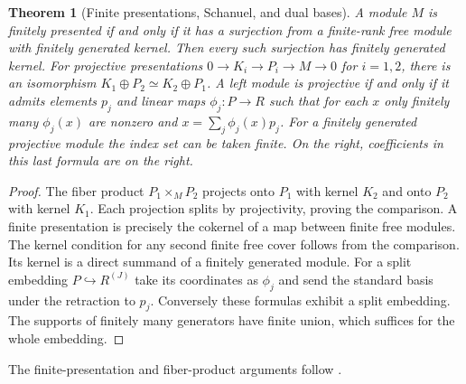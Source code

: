 \documentclass[11pt,oneside,openany]{book}
\newtheorem{theorem}{Theorem}[chapter]
\theoremstyle{definition}
\theoremstyle{remark}
\begin{document}
\begin{theorem}[Finite presentations, Schanuel, and dual bases]
\label{p103:ALG-03-C02-S02}
A module \(M\) is finitely presented if and only if it has a
surjection from a finite-rank free module with finitely generated
kernel. Then every such surjection has finitely generated kernel.
For projective presentations \(0\to K_i\to P_i\to M\to0\) for
\(i=1,2\), there is an isomorphism \(K_1\oplus P_2\simeq
K_2\oplus P_1\). A left module is projective if and only if it
admits elements \(p_j\) and linear maps \(\phi_j:P\to R\) such
that for each \(x\) only finitely many \(\phi_j(x)\) are nonzero
and \(x=\sum_j\phi_j(x)p_j\). For a finitely generated projective
module the index set can be taken finite. On the right, coefficients
in this last formula are on the right.
\end{theorem}
\begin{proof}
The fiber product \(P_1\times_M P_2\) projects onto \(P_1\) with
kernel \(K_2\) and onto \(P_2\) with kernel \(K_1\). Each projection
splits by projectivity, proving the comparison. A finite presentation
is precisely the cokernel of a map between finite free modules.
The kernel condition for any second finite free cover follows
from the comparison. Its kernel is a direct summand of a finitely
generated module. For a split embedding \(P\hookrightarrow
R^{(J)}\) take its coordinates as \(\phi_j\) and send the standard
basis under the retraction to \(p_j\). Conversely these formulas
exhibit a split embedding. The supports of finitely many generators
have finite union, which suffices for the whole embedding.
\end{proof}
The finite-presentation and fiber-product arguments follow
\cite[Sections 4D and 5A]{lam}.
\end{document}
